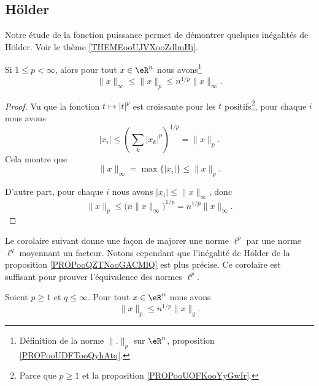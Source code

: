 \subsection{Hölder}

Notre étude de la fonction puissance permet de démontrer quelques inégalités de Hölder. Voir le thème \ref{THEMEooUJVXooZdlmHj}.

\begin{theorem}       \label{THOooPPDPooJxTYIy}
	Si \( 1\leq p <  \infty\), alors pour tout \( x\in \eR^n\) nous avons\footnote{Définition de la norme \( \| . \|_p\) sur \( \eR^n\), proposition \ref{PROPooUDFTooQyhAtq}.}
	\begin{equation}
		\| x \|_{\infty}\leq \| x \|_p\leq n^{1/p}\| x \|_{\infty}.
	\end{equation}
\end{theorem}

\begin{proof}
	Vu que la fonction \( t\mapsto | t |^p\) est croissante pour les \( t \) positifs\footnote{Parce que \( p\geq 1\) et la proposition \ref{PROPooUOFKooYyGwIr}.}, pour chaque \( i\) nous avons
	\begin{equation}
		| x_i |\leq \left( \sum_k| x_k |^p \right)^{1/p}=\| x \|_p.
	\end{equation}
	Cela montre que
	\begin{equation}
		\| x \|_{\infty}=\max\{ | x_i | \}\leq \| x \|_p.
	\end{equation}

	D'autre part, pour chaque \( i\) nous avons \( | x_i |\leq \| x \|_{\infty}\), donc
	\begin{equation}
		\| x \|_p\leq \big( n\| x \|_{\infty} \big)^{1/p}=n^{1/p}\| x \|_{\infty}.
	\end{equation}
\end{proof}

Le corolaire suivant donne une façon de majorer une norme \( \ell^p\) par une norme \( \ell^q\) moyennant un facteur. Notons cependant que l'inégalité de Hölder de la proposition \ref{PROPooQZTNooGACMlQ} est plus précise. Ce corolaire est suffisant pour prouver l'équivalence des normes \( \ell^p\).
\begin{corollary}       \label{CORooEZGHooACHOiB}
	Soient \( p\geq 1\) et \( q\leq \infty\). Pour tout \( x\in \eR^n\) nous avons
	\begin{equation}
		\| x \|_p\leq n^{1/p} \| x \|_q.
	\end{equation}
\end{corollary}

